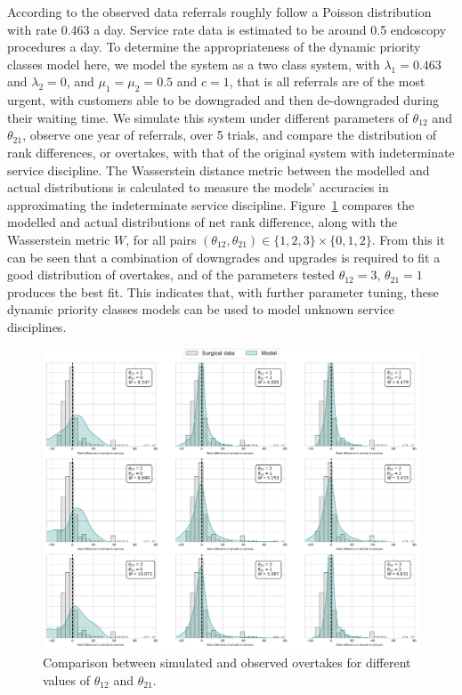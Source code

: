 \documentclass{article}
\begin{document}
According to the observed data referrals roughly follow a Poisson distribution
with rate 0.463 a day. Service rate data is estimated to be around 0.5
endoscopy procedures a day. To determine the appropriateness of the dynamic
priority classes model here, we model the system as a two class system, with
$\lambda_1 = 0.463$ and $\lambda_2 = 0$, and $\mu_1 = \mu_2 = 0.5$ and $c = 1$,
that is all referrals are of the most urgent, with customers able to be
downgraded and then de-downgraded during their waiting time. We simulate this
system under different parameters of $\theta_{12}$ and $\theta_{21}$, observe
one year of referrals, over 5 trials, and compare the distribution of rank
differences, or overtakes, with that of the original system with indeterminate
service discipline. The Wasserstein distance metric \cite{mostafaei11} between
the modelled and actual distributions is calculated to measure the models'
accuracies in approximating the indeterminate service discipline.
Figure~\ref{fig:fitting_theta} compares the modelled and actual distributions of
net rank difference, along with the Wasserstein metric $W$, for all pairs
$\left(\theta_{12}, \theta_{21}\right) \in \{1, 2, 3\}\times\{0, 1, 2\}$. From
this it can be seen that a combination of downgrades and upgrades is required to
fit a good distribution of overtakes, and of the parameters tested
$\theta_{12}=3$, $\theta_{21}=1$ produces the best fit. This indicates that,
with further parameter tuning, these dynamic priority classes models can be used
to model unknown service disciplines.

\begin{figure}
  \begin{center}
    \includegraphics[width=\textwidth]{img/fitting_theta.pdf}
  \end{center}
  \caption{Comparison between simulated and observed overtakes for different
  values of $\theta_{12}$ and $\theta_{21}$.}
  \label{fig:fitting_theta}
\end{figure}
\end{document}
